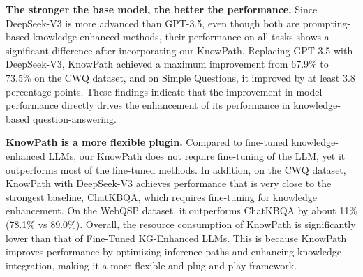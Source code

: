 \textbf{The stronger the base model, the better the performance.}
Since DeepSeek-V3 is more advanced than GPT-3.5, even though both are prompting-based knowledge-enhanced methods, their performance on all tasks shows a significant difference after incorporating our KnowPath.
Replacing GPT-3.5 with DeepSeek-V3, KnowPath achieved a maximum improvement from 67.9\% to 73.5\% on the CWQ dataset, and on Simple Questions, it improved by at least 3.8 percentage points.
These findings indicate that the improvement in model performance directly drives the enhancement of its performance in knowledge-based question-answering.

\textbf{KnowPath is a more flexible plugin.}
Compared to fine-tuned knowledge-enhanced LLMs, our KnowPath does not require fine-tuning of the LLM, yet it outperforms most of the fine-tuned methods.
In addition, on the CWQ dataset, KnowPath with DeepSeek-V3 achieves performance that is very close to the strongest baseline, ChatKBQA, which requires fine-tuning for knowledge enhancement. On the WebQSP dataset, it outperforms ChatKBQA by about 11\% (78.1\% vs 89.0\%).
Overall, the resource consumption of KnowPath is significantly lower than that of Fine-Tuned KG-Enhanced LLMs.
This is because KnowPath improves performance by optimizing inference paths and enhancing knowledge integration, making it a more flexible and plug-and-play framework.


